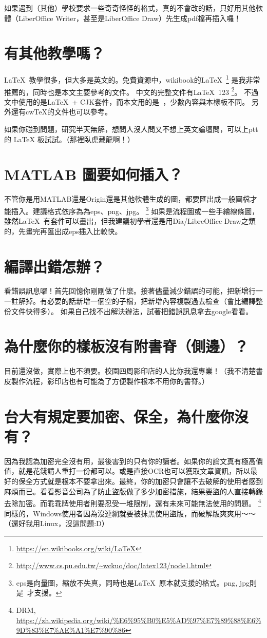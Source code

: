 \documentclass[class=NCU_thesis, crop=false, float=true]{standalone}
\begin{document}
如果遇到（其他）學校要求一些奇奇怪怪的格式，真的不會改的話，只好用其他軟體（LiberOffice Writer，甚至是LiberOffice Draw）先生成pdf檔再插入囉！
        
\section{有其他教學嗎？}
\LaTeX\ 教學很多，但大多是英文的。免費資源中，wikibook的\LaTeX\ 
\footnote{\url{https://en.wikibooks.org/wiki/LaTeX}}
是我非常推薦的，同時也是本文主要參考的文件。
中文的完整文件有\LaTeX\ 123
\footnote{\url{http://www.cs.pu.edu.tw/~wckuo/doc/latex123/node1.html}}。
不過文中使用的是\LaTeX\ + CJK套件，而本文用的是\XeLaTeX\ ，少數內容與本樣板不同。
另外還有cwTeX的文件也可以參考。

如果你碰到問題，研究半天無解，想問人沒人問又不想上英文論壇問，可以上ptt的 LaTeX 板試試。（那裡臥虎藏龍啊！）

\section{MATLAB 圖要如何插入？}
不管你是用MATLAB還是Origin還是其他軟體生成的圖，都要匯出成一般圖檔才能插入。建議格式依序為為eps、png、jpg。
\footnote{eps是向量圖，縮放不失真，同時也是\LaTeX\ 原本就支援的格式。png, jpg則是\XeLaTeX\ 才支援。}
如果是流程圖或一些手繪線條圖，雖然\LaTeX\ 有套件可以畫出，但我建議初學者還是用Dia/LibreOffice Draw之類的，先畫完再匯出成eps插入比較快。

\section{編譯出錯怎辦？}
看錯誤訊息囉！首先回憶你剛剛做了什麼。接著儘量減少錯誤的可能，把新增行一一註解掉。有必要的話新增一個空的子檔，把新增內容複製過去檢查（會比編譯整份文件快得多）。
如果自己找不出解決辦法，試著把錯誤訊息拿去google看看。

\section{為什麼你的樣板沒有附書脊（側邊）？}
目前還沒做，實際上也不須要。校園四周影印店的人比你我還專業！（我不清楚書皮製作流程，影印店也有可能為了方便製作根本不用你的書脊。）

\section{台大有規定要加密、保全，為什麼你沒有？}
{\color{red}因為我認為加密完全沒有用，最後害到的只有你的讀者。}如果你的論文真有極高價值，就是花錢請人重打一份都可以。或是直接OCR也可以獲取文章資訊，所以最好的保全方式就是根本不要拿出來。最終，你的加密只會讓不去破解的使用者感到麻煩而已。看看影音公司為了防止盜版做了多少加密措施，結果要盜的人直接轉錄去除加密。而乖乖牌使用者則要忍受一堆限制，還有未來可能無法使用的問題。
\footnote{DRM, \url{https://zh.wikipedia.org/wiki/\%E6\%95\%B0\%E5\%AD\%97\%E7\%89\%88\%E6\%9D\%83\%E7\%AE\%A1\%E7\%90\%86}}
同樣的，Windows使用者因為沒連網就要被抹黑使用盜版，而破解版爽爽用～～（還好我用Linux，沒這問題:D）
\end{document}
